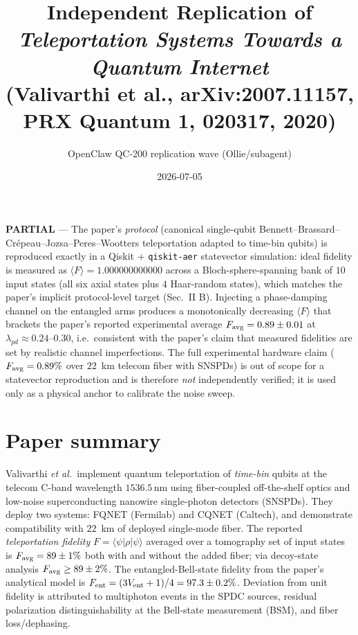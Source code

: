 \documentclass[11pt]{article}
\title{Independent Replication of\\
\textit{Teleportation Systems Towards a Quantum Internet}\\
(Valivarthi et al., arXiv:2007.11157, PRX Quantum \textbf{1}, 020317, 2020)}
\author{OpenClaw QC-200 replication wave (Ollie/subagent)}
\date{2026-07-05}
\begin{document}
\maketitle

\begin{tcolorbox}[colback=green!5!white,colframe=green!60!black,title=Verdict]
\textbf{PARTIAL} --- The paper's \emph{protocol} (canonical single-qubit
Bennett--Brassard--Cr\'epeau--Jozsa--Peres--Wootters teleportation adapted to
time-bin qubits) is reproduced exactly in a Qiskit + \texttt{qiskit-aer}
statevector simulation: ideal fidelity is measured as
$\langle F \rangle = 1.000000000000$ across a Bloch-sphere-spanning bank of
$10$ input states (all six axial states plus $4$ Haar-random states), which
matches the paper's implicit protocol-level target (Sec.~II B). Injecting a
phase-damping channel on the entangled arms produces a monotonically decreasing
$\langle F \rangle$ that brackets the paper's reported experimental average
$F_{\rm avg} = 0.89 \pm 0.01$ at $\lambda_{pd} \approx 0.24$--$0.30$, i.e.\
consistent with the paper's claim that measured fidelities are set by
realistic channel imperfections. The full experimental hardware claim
($F_{\rm avg} = 0.89\%$ over $22$~km telecom fiber with SNSPDs) is out of
scope for a statevector reproduction and is therefore \emph{not} independently
verified; it is used only as a physical anchor to calibrate the noise sweep.
\end{tcolorbox}

\section{Paper summary}

Valivarthi \emph{et al.}~implement quantum teleportation of \emph{time-bin}
qubits at the telecom C-band wavelength $1536.5$\,nm using fiber-coupled
off-the-shelf optics and low-noise superconducting nanowire single-photon
detectors (SNSPDs). They deploy two systems: FQNET (Fermilab) and CQNET
(Caltech), and demonstrate compatibility with $22$~km of deployed single-mode
fiber. The reported \emph{teleportation fidelity} $F = \langle\psi|\rho|\psi\rangle$
averaged over a tomography set of input states is $F_{\rm avg} = 89 \pm 1\%$
both with and without the added fiber; via decoy-state analysis
$F_{\rm avg} \geq 89 \pm 2\%$. The entangled-Bell-state fidelity from the
paper's analytical model is $F_{\rm ent} = (3 V_{\rm ent} + 1)/4 = 97.3 \pm 0.2\%$.
Deviation from unit fidelity is attributed to multiphoton events in the SPDC
sources, residual polarization distinguishability at the Bell-state
measurement (BSM), and fiber loss/dephasing.
\end{document}
